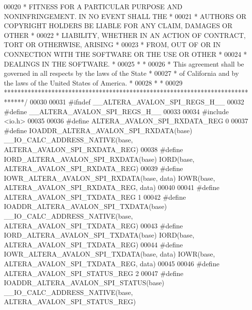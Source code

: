 \begin{DoxyCode}
00020 \textcolor{comment}{* FITNESS FOR A PARTICULAR PURPOSE AND NONINFRINGEMENT. IN NO EVENT SHALL THE *}
00021 \textcolor{comment}{* AUTHORS OR COPYRIGHT HOLDERS BE LIABLE FOR ANY CLAIM, DAMAGES OR OTHER      *}
00022 \textcolor{comment}{* LIABILITY, WHETHER IN AN ACTION OF CONTRACT, TORT OR OTHERWISE, ARISING     *}
00023 \textcolor{comment}{* FROM, OUT OF OR IN CONNECTION WITH THE SOFTWARE OR THE USE OR OTHER         *}
00024 \textcolor{comment}{* DEALINGS IN THE SOFTWARE.                                                   *}
00025 \textcolor{comment}{*                                                                             *}
00026 \textcolor{comment}{* This agreement shall be governed in all respects by the laws of the State   *}
00027 \textcolor{comment}{* of California and by the laws of the United States of America.              *}
00028 \textcolor{comment}{*                                                                             *}
00029 \textcolor{comment}{******************************************************************************/}
00030 
00031 \textcolor{preprocessor}{#ifndef \_\_ALTERA\_AVALON\_SPI\_REGS\_H\_\_}
00032 \textcolor{preprocessor}{#define \_\_ALTERA\_AVALON\_SPI\_REGS\_H\_\_}
00033 
00034 \textcolor{preprocessor}{#include <io.h>}
00035 
00036 \textcolor{preprocessor}{#define ALTERA\_AVALON\_SPI\_RXDATA\_REG                  0}
00037 \textcolor{preprocessor}{#define IOADDR\_ALTERA\_AVALON\_SPI\_RXDATA(base)         \_\_IO\_CALC\_ADDRESS\_NATIVE(base,
       ALTERA\_AVALON\_SPI\_RXDATA\_REG)}
00038 \textcolor{preprocessor}{#define IORD\_ALTERA\_AVALON\_SPI\_RXDATA(base)           IORD(base, ALTERA\_AVALON\_SPI\_RXDATA\_REG) }
00039 \textcolor{preprocessor}{#define IOWR\_ALTERA\_AVALON\_SPI\_RXDATA(base, data)     IOWR(base, ALTERA\_AVALON\_SPI\_RXDATA\_REG, data)}
00040 
00041 \textcolor{preprocessor}{#define ALTERA\_AVALON\_SPI\_TXDATA\_REG                  1}
00042 \textcolor{preprocessor}{#define IOADDR\_ALTERA\_AVALON\_SPI\_TXDATA(base)         \_\_IO\_CALC\_ADDRESS\_NATIVE(base,
       ALTERA\_AVALON\_SPI\_TXDATA\_REG)}
00043 \textcolor{preprocessor}{#define IORD\_ALTERA\_AVALON\_SPI\_TXDATA(base)           IORD(base, ALTERA\_AVALON\_SPI\_TXDATA\_REG) }
00044 \textcolor{preprocessor}{#define IOWR\_ALTERA\_AVALON\_SPI\_TXDATA(base, data)     IOWR(base, ALTERA\_AVALON\_SPI\_TXDATA\_REG, data)}
00045 
00046 \textcolor{preprocessor}{#define ALTERA\_AVALON\_SPI\_STATUS\_REG                  2}
00047 \textcolor{preprocessor}{#define IOADDR\_ALTERA\_AVALON\_SPI\_STATUS(base)         \_\_IO\_CALC\_ADDRESS\_NATIVE(base,
       ALTERA\_AVALON\_SPI\_STATUS\_REG)}

\end{DoxyCode}
